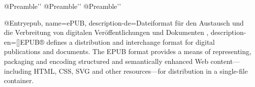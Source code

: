 @Preamble{'\RequirePackage{csquotes}'}
@Preamble{'\RequirePackage{biblatex}'}
@Preamble{''}

@Entry{epub,
	name={ePUB},
	description-de={Dateiformat für den Austausch und die Verbreitung von digitalen Veröffentlichungen und Dokumenten \autocite{w3:epub3}},
	description-en={[\autocite{w3:epub3}]{EPUB® defines a distribution and interchange format for digital publications and documents. The EPUB format provides a means of representing, packaging and encoding structured and semantically enhanced Web content—including HTML, CSS, SVG and other resources—for distribution in a single-file container.}}
}
